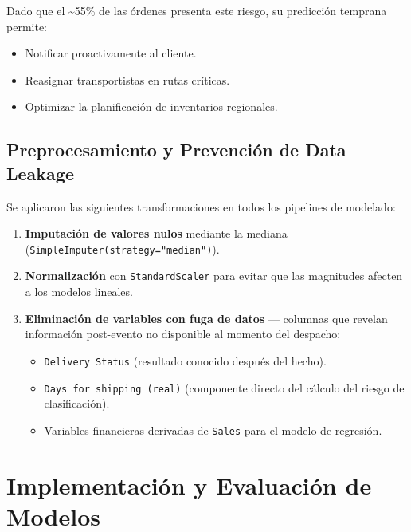 \documentclass[
  letterpaper,
  DIV=11,
  numbers=noendperiod]{scrartcl}
\providecommand{\tightlist}{%
  \setlength{\itemsep}{0pt}\setlength{\parskip}{0pt}}
\begin{document}
Dado que el \textasciitilde55\% de las órdenes presenta este riesgo, su
predicción temprana permite:

\begin{itemize}
\tightlist
\item
  Notificar proactivamente al cliente.
\item
  Reasignar transportistas en rutas críticas.
\item
  Optimizar la planificación de inventarios regionales.
\end{itemize}

\subsection{Preprocesamiento y Prevención de Data
Leakage}\label{preprocesamiento-y-prevenciuxf3n-de-data-leakage}

Se aplicaron las siguientes transformaciones en todos los pipelines de
modelado:

\begin{enumerate}
\def\labelenumi{\arabic{enumi}.}
\tightlist
\item
  \textbf{Imputación de valores nulos} mediante la mediana
  (\texttt{SimpleImputer(strategy="median")}).
\item
  \textbf{Normalización} con \texttt{StandardScaler} para evitar que las
  magnitudes afecten a los modelos lineales.
\item
  \textbf{Eliminación de variables con fuga de datos} --- columnas que
  revelan información post-evento no disponible al momento del despacho:

  \begin{itemize}
  \tightlist
  \item
    \texttt{Delivery\ Status} (resultado conocido después del hecho).
  \item
    \texttt{Days\ for\ shipping\ (real)} (componente directo del cálculo
    del riesgo de clasificación).
  \item
    Variables financieras derivadas de \texttt{Sales} para el modelo de
    regresión.
  \end{itemize}
\end{enumerate}

\section{Implementación y Evaluación de
Modelos}\label{implementaciuxf3n-y-evaluaciuxf3n-de-modelos}
\end{document}
